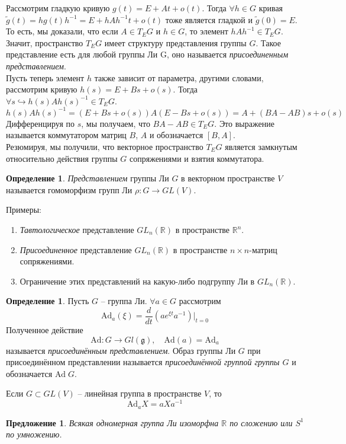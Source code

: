 \documentclass[12pt]{article}
\newtheorem{predl}[theorem]{Предложение}
\theoremstyle{definition}
\newtheorem{defin}[theorem]{Определение}
\begin{document}
Рассмотрим гладкую кривую $g(t)=E+At+o(t)$. Тогда $\forall h\in G$ кривая $\tilde{g}(t)=hg(t)h^{-1}=E+hAh^{-1}t+o(t)$ тоже является гладкой и $\tilde{g}(0)=E$. То есть, мы доказали, что если $A\in T_EG$ и $h\in G$, то элемент $hAh^{-1}\in T_EG$. Значит, пространство $T_EG$ имеет структуру представления группы $G$. Такое представление есть для любой группы Ли G, оно называется \textit{присоединенным представлением}.\\
Пусть теперь элемент $h$ также зависит от параметра, другими словами, рассмотрим кривую $h(s) = E + Bs + o(s)$. Тогда $\forall s\hookrightarrow h(s)Ah(s)^{-1}\in T_EG$.
\begin{equation}
    h(s)Ah(s)^{-1} = (E + Bs + o(s))A(E-Bs + o(s)) = A + (BA-AB)s + o(s)
\end{equation}
Дифференцируя по $s$, мы получаем, что $BA-AB\in T_EG$. Это выражение называется коммутатором матриц $B$, $A$ и обозначается $[B, A]$.\\
Резюмируя, мы получили, что векторное пространство $T_EG$ является замкнутым относительно действия группы $G$ сопряжениями и взятия коммутатора.
\begin{defin}
\textit{Представлением} группы Ли $G$ в векторном пространстве $V$ называется гомоморфизм групп Ли $\rho: G \rightarrow GL(V)$.
\end{defin}
Примеры:
\begin{enumerate}
    \item \textit{Тавтологическое} представление $GL_n(\mathbb{R})$ в пространстве $\mathbb{R}^n$.
    \item \textit{Присоединенное} представление $GL_n(\mathbb{R})$ в пространстве $n\times n$-матриц сопряжениями.
    \item Ограничение этих представлений на какую-либо подгруппу Ли в $GL_n(\mathbb{R})$.
\end{enumerate}
\begin{defin}
Пусть $G$ -- группа Ли. $\forall a\in G$ рассмотрим
\begin{equation}
    \text{Ad}_a(\xi)=\frac{d}{dt}(ae^{\xi t}a^{-1})|_{t=0}
\end{equation}
Полученное действие
\begin{equation}
    \text{Ad}:G\rightarrow Gl(\mathfrak{g}),\quad \text{Ad}(a)=\text{Ad}_a
\end{equation}
называется \textit{присоединённым представлением}. Образ группы Ли $G$ при присоединённом представлении называется \textit{присоединённой группой группы $G$} и обозначается $\text{Ad}\;G$.
\end{defin}
Если $G\subset GL(V)$ -- линейная группа в пространстве $V$, то
\begin{equation}
    \text{Ad}_aX=aXa^{-1}
\end{equation}
\begin{predl}
    Всякая одномерная группа Ли изоморфна $\mathbb{R}$ по сложению или $S^1$ по умножению.
\end{predl}
\end{document}

